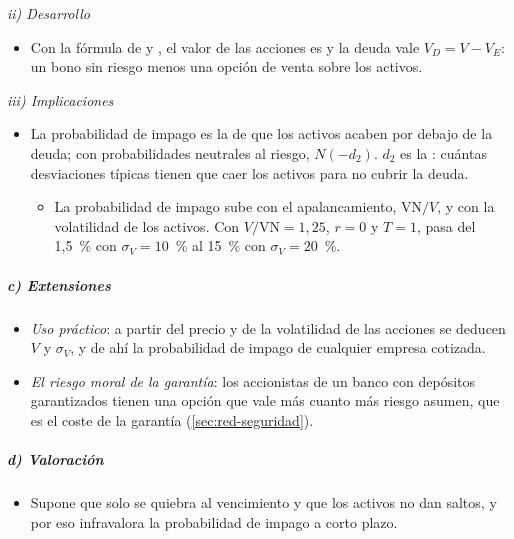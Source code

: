 \documentclass[11pt]{article}
\begin{document}
\hspace*{3.6em}\emph{ii) Desarrollo}

\begin{itemize}
\item Con la fórmula de  y , el valor de las acciones es
  y la deuda vale $V_D=V-V_E$: un bono sin riesgo menos una opción de venta sobre los activos.
\end{itemize}

\hspace*{3.6em}\emph{iii) Implicaciones}

\begin{itemize}
\item La probabilidad de impago es la de que los activos acaben por debajo de la deuda; con probabilidades neutrales al riesgo, $N(-d_2)$. $d_2$ es la : cuántas desviaciones típicas tienen que caer los activos para no cubrir la deuda.
  \begin{itemize}
  \item La probabilidad de impago sube con el apalancamiento, $\mathrm{VN}/V$, y con la volatilidad de los activos. Con $V/\mathrm{VN}=1{,}25$, $r=0$ y $T=1$, pasa del 1,5~\% con $\sigma_V=10$~\% al 15~\% con $\sigma_V=20$~\%.
  \end{itemize}
\end{itemize}

\subparagraph{c) Extensiones}

\begin{itemize}
\item \emph{Uso práctico}: a partir del precio y de la volatilidad de las acciones se deducen $V$ y $\sigma_V$, y de ahí la probabilidad de impago de cualquier empresa cotizada\nocite{Hull2023Risk}.
\item \emph{El riesgo moral de la garantía}: los accionistas de un banco con depósitos garantizados tienen una opción que vale más cuanto más riesgo asumen\nocite{Merton1977Analytic}, que es el coste de la garantía (\ref{sec:red-seguridad}).
\end{itemize}

\subparagraph{d) Valoración}

\begin{itemize}
\item Supone que solo se quiebra al vencimiento y que los activos no dan saltos, y por eso infravalora la probabilidad de impago a corto plazo.
\end{itemize}
\end{document}

